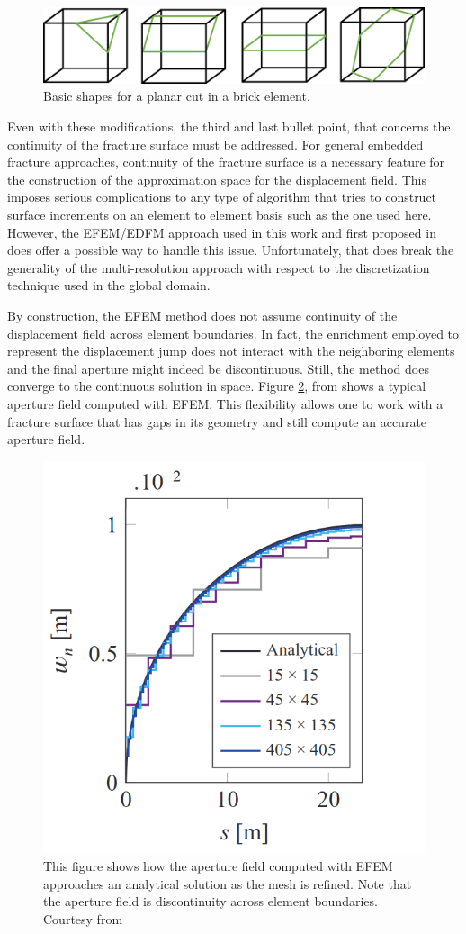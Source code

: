 \begin{figure}[h]
    \centering
    \includegraphics[width=0.8\linewidth]{Chapter4/figures/nonplanar/pre_cuts.png}
    \caption{Basic shapes for a planar cut in a brick element.}
    \label{fig:pre_cuts}
\end{figure}

Even with these modifications, the third and last bullet point, that concerns the continuity of the fracture surface must be addressed. For general embedded fracture approaches, continuity of the fracture surface is a necessary feature for the construction of the approximation space for the displacement field. This imposes serious complications to any type of algorithm that tries to construct surface increments on an element to element basis such as the one used here. However, the EFEM/EDFM approach used in this work and first proposed in \cite{cusini2021simulation} does offer a possible way to handle this issue. Unfortunately, that does break the generality of the multi-resolution approach with respect to the discretization technique used in the global domain. 

By construction, the EFEM method does not assume continuity of the displacement field across element boundaries. In fact, the enrichment employed to represent the displacement jump does not interact with the neighboring elements and the final aperture might indeed be discontinuous. Still, the method does converge to the continuous solution in space. Figure \ref{fig:efem_apertures}, from \cite{cusini2021simulation} shows a typical aperture field computed with EFEM. This flexibility allows one to work with a fracture surface that has gaps in its geometry and still compute an accurate aperture field. 

\begin{figure}[h]
    \centering
    \includegraphics[width=0.5\linewidth]{Chapter4/figures/nonplanar/efem_aperture.png}
    \caption{This figure shows how the aperture field computed with EFEM approaches an analytical solution as the mesh is refined. Note that the aperture field is discontinuity across element boundaries. Courtesy from \cite{cusini2021simulation}}
    \label{fig:efem_apertures}
\end{figure}

